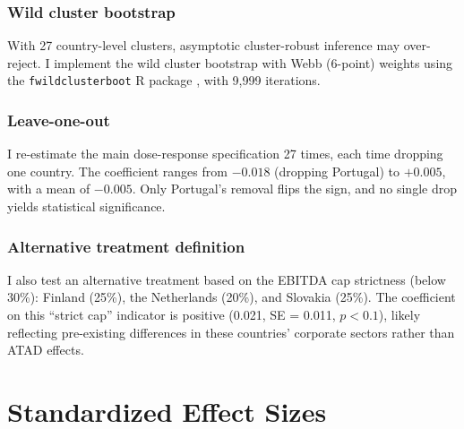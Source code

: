 \documentclass[12pt]{article}
\begin{document}
\subsubsection*{Wild cluster bootstrap} With 27 country-level clusters, asymptotic cluster-robust inference may over-reject. I implement the wild cluster bootstrap with Webb (6-point) weights \citep{webb2014reworking} using the \texttt{fwildclusterboot} R package \citep{fischer2021fwildclusterboot}, with 9,999 iterations.

\subsubsection*{Leave-one-out} I re-estimate the main dose-response specification 27 times, each time dropping one country. The coefficient ranges from $-0.018$ (dropping Portugal) to $+0.005$, with a mean of $-0.005$. Only Portugal's removal flips the sign, and no single drop yields statistical significance.

\subsubsection*{Alternative treatment definition} I also test an alternative treatment based on the EBITDA cap strictness (below 30\%): Finland (25\%), the Netherlands (20\%), and Slovakia (25\%). The coefficient on this ``strict cap'' indicator is positive (0.021, SE = 0.011, $p < 0.1$), likely reflecting pre-existing differences in these countries' corporate sectors rather than ATAD effects.

\section{Standardized Effect Sizes}
\label{sec:sde}


\end{document}
